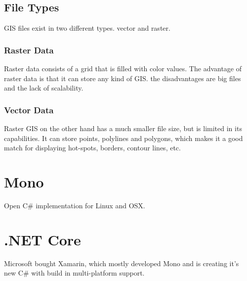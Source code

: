 \subsection{File Types}
GIS files exist in two different types. vector and raster.

\subsubsection{Raster Data}
 Raster data consists of a grid that is filled with color values. The advantage of raster data is that it can store any kind of GIS. the disadvantages are big files and the lack of scalability.

\subsubsection{Vector Data}
Raster GIS on the other hand has a much smaller file size, but is limited in its capabilities. It can store points, polylines and polygons, which makes it a good match for displaying hot-spots, borders, contour lines, etc.



\section{Mono}
Open C\# implementation for Linux and OSX.



\section{.NET Core}
Microsoft bought Xamarin, which mostly developed Mono and is creating it's new C\# with build in multi-platform support.
